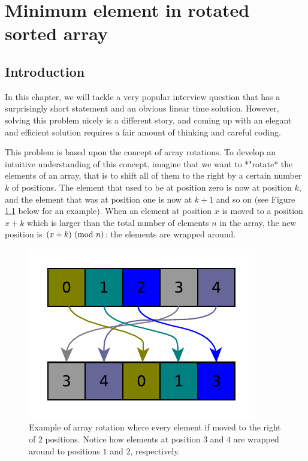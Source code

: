 %

\chapter{Minimum element in rotated sorted array}
\label{ch:min_rotated_array}
\section*{Introduction}
In this chapter, we will tackle a very popular interview question that has a surprisingly short statement and an obvious linear time solution. However, solving this problem nicely is a different story, and coming up with an elegant and efficient solution requires a fair amount of thinking and careful coding.

This problem is based upon the concept of array rotations. To develop an intuitive understanding of this concept, imagine that we want to *"rotate* the elements of an array, that is to shift all of them to the right by a certain number $k$ of positions. The element that used to be at position zero is now at position $k$, and the element that was at position one is now at $k+1$ and so on (see Figure \ref{fig:min_rotated_array:arrayrotation}  below for an example). When an element at position $x$ is moved to a position $x+k$ which is larger than the total number of elements $n$ in the array, the new position is $(x+k) \ (\mathrm{mod}\ n)$: the elements are wrapped around.

\begin{figure}
	\centering
	\includegraphics{sources/min_rotated_array/images/arrayrotation}
	\caption{Example of array rotation where every element if moved to the right of 2 positions. Notice how elements at position $3$ and $4$ are wrapped around to positions $1$ and $2$, respectively.}
	\label{fig:min_rotated_array:arrayrotation}
\end{figure}


